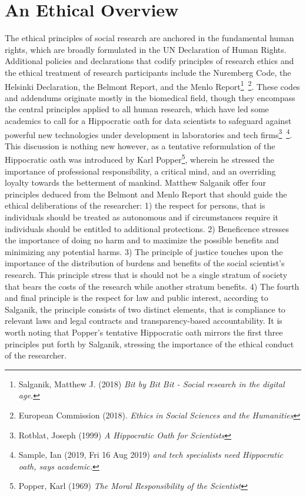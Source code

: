 \documentclass[12pt,a4paper]{article}
\begin{document}
\section{An Ethical Overview}
The ethical principles of social research are anchored in the fundamental human rights, which are broadly formulated in the UN Declaration of Human Rights. Additional policies and declarations that codify principles of research ethics and the ethical treatment of research participants include the Nuremberg Code, the Helsinki Declaration, the Belmont Report, and the Menlo Report\footnote{Salganik, Matthew J. (2018) \textit{Bit by Bit Bit - Social research in the digital age.}}\, \footnote{European Commission (2018). \textit{Ethics in Social Sciences and the Humanities}}. These codes and addendums originate mostly in the biomedical field, though they encompass the central principles applied to all human research, which have led some academics to call for a Hippocratic oath for data scientists to safeguard against powerful new technologies under development in laboratories and tech firms\footnote{Rotblat, Joseph (1999) \textit{A Hippocratic Oath for Scientists}}\, \footnote{Sample, Ian (2019, Fri 16 Aug 2019) \textit{and tech specialists need Hippocratic oath, says academic.}}. This discussion is nothing new however, as a tentative reformulation of the Hippocratic oath was introduced by Karl Popper\footnote{Popper, Karl (1969) \textit{The Moral Responsibility of the Scientist}}, wherein he stressed the importance of professional responsibility, a critical mind, and an overriding loyalty towards the betterment of mankind.\newline
Matthew Salganik offer four principles deduced from the Belmont and Menlo Report that should guide the ethical deliberations of the researcher: 1) the respect for persons, that is individuals should be treated as autonomous and if circumstances require it individuals should be entitled to additional protections. 2) Beneficence stresses the importance of doing no harm and to maximize the possible benefits and minimizing any potential harms. 3) The principle of justice touches upon the importance of the distribution of burdens and benefits of the social scientist's research. This principle stress that is should not be a single stratum of society that bears the costs of the research while another stratum benefits. 4) The fourth and final principle is the respect for law and public interest, according to Salganik, the principle consists of two distinct elements, that is compliance to relevant laws and legal contracts and transparency-based accountability. It is worth noting that Popper’s tentative Hippocratic oath mirrors the first three principles put forth by Salganik, stressing the importance of the ethical conduct of the researcher.\newline
\end{document}
